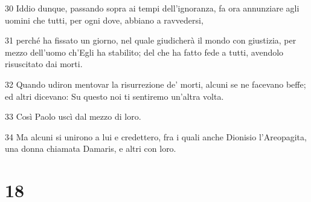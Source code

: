 \par 30 Iddio dunque, passando sopra ai tempi dell'ignoranza, fa ora annunziare agli uomini che tutti, per ogni dove, abbiano a ravvedersi,
\par 31 perché ha fissato un giorno, nel quale giudicherà il mondo con giustizia, per mezzo dell'uomo ch'Egli ha stabilito; del che ha fatto fede a tutti, avendolo risuscitato dai morti.
\par 32 Quando udiron mentovar la risurrezione de' morti, alcuni se ne facevano beffe; ed altri dicevano: Su questo noi ti sentiremo un'altra volta.
\par 33 Così Paolo uscì dal mezzo di loro.
\par 34 Ma alcuni si unirono a lui e credettero, fra i quali anche Dionisio l'Areopagita, una donna chiamata Damaris, e altri con loro.

\chapter{18}

